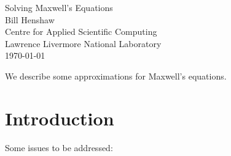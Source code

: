 \documentclass[10pt]{article}
\newcommand{\grad}{\nabla}
\begin{document}



\newcommand{\Div}{\grad\cdot}
\newcommand{\tauv}{\boldsymbol{\tau}}
\newcommand{\kappav}{\boldsymbol{\kappa}}
\newcommand{\sumi}{\sum_{i=1}^n}
\newcommand{\deltaT}{{\Delta t}}
\newcommand{\dt}{{\Delta t}}

\vspace{5\baselineskip}
\begin{flushleft}
{\LARGE Solving Maxwell's Equations} \\
\vspace{2\baselineskip}
Bill Henshaw  \\
Centre for Applied Scientific Computing  \\
Lawrence Livermore National Laboratory      \\
\vspace{\baselineskip}
\today\\

\vspace{2\baselineskip}


We describe some approximations for Maxwell's equations.

\end{flushleft}

\tableofcontents

\newcommand{\eps}{\epsilon}

\section{Introduction}

  Some issues to be addressed:
\end{document}
